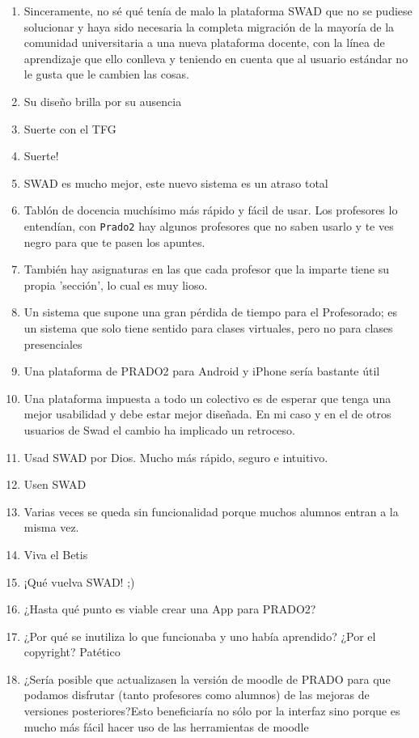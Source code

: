 \begin{enumerate}
\item Sinceramente, no sé qué tenía de malo la plataforma SWAD que no se pudiese solucionar y haya sido necesaria la completa migración de la mayoría de la comunidad universitaria a una nueva plataforma docente, con la línea de aprendizaje que ello conlleva y teniendo en cuenta que al usuario estándar no le gusta que le cambien las cosas.
\item Su diseño brilla por su ausencia
\item Suerte con el TFG
\item Suerte!
\item SWAD es mucho mejor, este nuevo sistema es un atraso total
\item Tablón de docencia muchísimo más rápido y fácil de usar. Los profesores lo entendían, con \texttt{Prado2} hay algunos profesores que no saben usarlo y te ves negro para que te pasen los apuntes.
\item También hay asignaturas en las que cada profesor que la imparte tiene su propia 'sección', lo cual es muy lioso.
\item Un sistema que supone una gran pérdida de tiempo para el Profesorado; es un sistema que solo tiene sentido para clases virtuales, pero no para clases presenciales
\item Una plataforma de PRADO2 para Android y iPhone sería bastante útil
\item Una plataforma impuesta a todo un colectivo es de esperar que tenga una mejor usabilidad y debe estar mejor diseñada. En mi caso y en el de otros usuarios de Swad el cambio ha implicado un retroceso.
\item Usad SWAD por Dios. Mucho más rápido, seguro e intuitivo.
\item Usen SWAD
\item Varias veces se queda sin funcionalidad porque muchos alumnos entran a la misma vez.
\item Viva el Betis
\item ¡Qué vuelva SWAD! ;)
\item ¿Hasta qué punto es viable crear una App para PRADO2?
\item ¿Por qué se inutiliza lo que funcionaba y uno había aprendido? ¿Por el copyright? Patético
\item ¿Sería posible que actualizasen la versión de moodle de PRADO para que podamos disfrutar (tanto profesores como alumnos) de las mejoras de versiones posteriores?Esto beneficiaría no sólo por la interfaz sino porque es mucho más fácil hacer uso de las herramientas de moodle
\end{enumerate}




